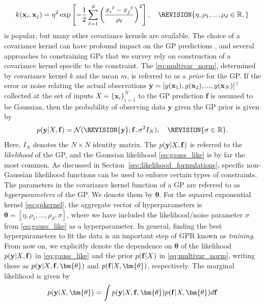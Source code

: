 \begin{equation} 
k(\bold{x}_{i},\mathbf{x}_{j}) = \eta^2\exp\left[-\frac{1}{2}\sum_{\ell=1}^{d}
\left(\frac{{x_i}^{\ell}-{x_j}^{\ell}}{\rho_\ell}\right)^2\right], \quad \REVISION{\eta, \rho_1, ..., \rho_d \in \mathbb{R},}
\label{eq:gpkernel}
\end{equation}
is popular, but many other covariance kernels are available. The choice of a covariance kernel can have profound impact on the GP predictions , and several approaches to constraining GPs that we survey rely on construction
of a covariance kernel specific to the constraint.
The  \eqref{eq:multivar_norm}, determined by covariance kernel $k$ and the mean $m$, is referred to as a \emph{prior} for the GP. If the error or noise relating the actual observations $\mathbf{y} = [y(\bold{x}_1),y(\mathbf{x}_2),...,y(\mathbf{x}_N)]^\top$ collected at the set of inputs $X=\{\mathbf{x}_i\}_{i=1}^N$ to the GP prediction $\mathbf{f}$ is assumed to be Gaussian, then the probability of observing data 
$\mathbf{y}$ given the GP prior is given by
\begin{equation}\label{eq:gauss_like}
p(\bold{y}|X,\bold{f}) = \mathcal{N}(\REVISION{\bold{y}}; \mathbf{f},\sigma^2 I_N), \quad \REVISION{\sigma \in \mathbb{R}}.
\end{equation}
Here, $I_N$ denotes the $N \times N$ identity matrix. The  $p(\bold{y}|X,\bold{f})$ is referred to the \emph{likelihood} of the GP, and the Gaussian likelihood \eqref{eq:gauss_like} is by far the most common. As discussed in Section~\ref{sec:likelihood_formulations}, specific non-Gaussian likelihood functions can be used to enforce certain types of constraints.
The parameters in the covariance kernel function of a GP are referred to as \emph{hyperparameters} of the GP. We denote them by $\bm{\theta}$.
For the squared exponential kernel \eqref{eq:gpkernel}, the aggregate vector of hyperparameters is  
$\bm{\theta}=[\eta, \rho_1, ..., \rho_d, \sigma]$, where we have included the likelihood/noise parameter $\sigma$ from \eqref{eq:gauss_like} as a hyperparameter. In general, finding the best hyperparameters to fit the data is an important step of GPR known as \emph{training}. From now on, we explicitly denote the dependence on $\bm{\theta}$ of the likelihood $p(\bold{y}|X,\bold{f})$ in \eqref{eq:gauss_like} and the prior $p(\bold{f}|X)$ in \eqref{eq:multivar_norm}, writing these as $p(\bold{y}|X,\bold{f}, \bm{\theta})$ and $p(\bold{f}|X, \bm{\theta})$, respectively. 
The marginal likelihood is given by 
\begin{equation}\label{eq:marginal-likelihood}
p(\bold{y}|X,\bm{\theta})=\int{p(\bold{y}|X,\bold{f},\bm{\theta})p(\bold{f}|X,\bm{\theta}) d\bold{f}}
\end{equation} 
